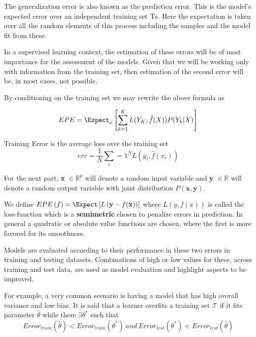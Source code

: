  The generalization error is also known as the prediction error. This is the model's expected error over an independent training set $\mathrm{Ts}$. Here the expectation is taken over all the random elements of this process including the samples and the model fit from these. 
 
 In a supervised learning context, the estimation of these errors will be of most importance for the assessment of the models.  Given  that we will be working only with information from the training set, then estimation of the second error will be, in most cases, not possible.
 
 By conditioning on the training set we may rewrite the above formula as 
 
 \begin{equation}\label{classificationEPE}
 EPE = \Expect_x\left[ \sum_{k=1}^{K} L( Y_K , \hat{f}(X) ) P(Y_k|X) \right]
 \end{equation}
 
 
 \begin{definition}{Training Error}
 	is the average loss over the training set
 	$$ \overline{err} = \frac{1}{N} \sum_i=1^N L(y_i, \hat{f}(x_i) )$$
 \end{definition}
 
 
 For the next part, \textbf{x} $\in \mathbb{R}^{p}$ will denote a random input variable and \textbf{y}  $\in \mathbb{R}$ will denote a random output variable with joint distribution $P\left(\textbf{x},\textbf{y}\right)$.
 
 We define $EPE\left(f \right) = \Expect\left[L\left(\textbf{y} - f(\textbf{x}) \right) \right] $ where $L(y,f\left(x\right))$ is called the loss-function which is a \textbf{semimetric} chosen to penalize errors in prediction. In general a quadratic or absolute value functions are chosen, where the first is more favored for its smoothness. 
 
 
 Models are evaluated according to their performance in these two errors in training and testing datasets. Combinations of high or low values for these, across training and test data, are used as model evaluation and highlight aspects to be improved. 
 
 For example, a very common scenario is having a model that has high overall variance and low bias. 
 It is said that a learner overfits a training set $\mathcal{T}$ if it fits parameter $\hat{\theta}$ while there $\exists \theta^*$ such that
 \begin{equation} \label{eq:overfitting}
 Error_{train}(\hat{\theta}) < Error_{train}(\theta^*) \  and \ Error_{test}(\theta^*) < Error_{test}(\hat{\theta})   
 \end{equation}
 
